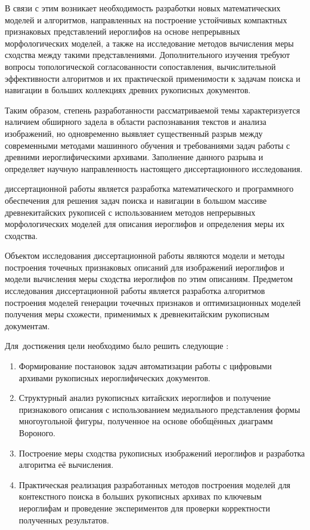 В связи с этим возникает необходимость разработки новых математических моделей и алгоритмов, направленных на построение устойчивых компактных признаковых представлений иероглифов на основе непрерывных морфологических моделей, а также на исследование методов вычисления меры сходства между такими представлениями. Дополнительного изучения требуют вопросы топологической согласованности сопоставления, вычислительной эффективности алгоритмов и их практической применимости к задачам поиска и навигации в больших коллекциях древних рукописных документов.

Таким образом, степень разработанности рассматриваемой темы характеризуется наличием обширного задела в области распознавания текстов и анализа изображений, но одновременно выявляет существенный разрыв между современными методами машинного обучения и требованиями задач работы с древними иероглифическими архивами. Заполнение данного разрыва и определяет научную направленность настоящего диссертационного исследования.

{\aim} диссертационной работы является разработка математического и программного обеспечения для решения задач поиска и навигации в большом массиве древнекитайских рукописей с использованием методов непрерывных морфологических моделей для описания иероглифов и определения меры их сходства.

Объектом исследования диссертационной работы являются модели и методы построения точечных признаковых описаний для изображений иероглифов и модели вычисления меры сходства иероглифов по этим описаниям. Предметом исследования диссертационной работы является разработка алгоритмов построения моделей генерации точечных признаков и оптимизационных моделей получения меры схожести, применимых к древнекитайским рукописным документам.

Для~достижения цели необходимо было решить следующие {\tasks}:
\begin{enumerate}[beginpenalty=10000] %
    \item Формирование постановок задач автоматизации работы с цифровыми архивами рукописных иероглифических документов.
    \item Структурный анализ рукописных китайских иероглифов и получение признакового описания с использованием медиального представления формы многоугольной фигуры, полученное на основе обобщённых диаграмм Вороного.
    \item Построение меры сходства рукописных изображений иероглифов и разработка алгоритма её вычисления.
    \item Практическая реализация разработанных методов построения моделей для контекстного поиска в больших рукописных архивах по ключевым иероглифам и проведение экспериментов для проверки корректности полученных результатов.
\end{enumerate}

